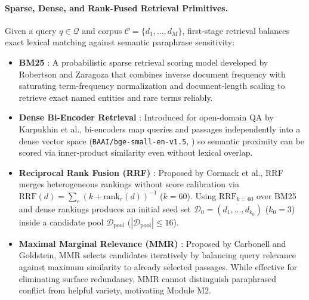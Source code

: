 \documentclass[11pt]{article}
\begin{document}
\paragraph{Sparse, Dense, and Rank-Fused Retrieval Primitives.}
Given a query $q \in \mathcal{Q}$ and corpus $\mathcal{C} = \{d_1, \dots, d_M\}$, first-stage retrieval balances exact lexical matching against semantic paraphrase sensitivity:
\begin{itemize}[leftmargin=*,nosep]
    \item \textbf{BM25} \cite{robertson2009bm25}: A probabilistic sparse retrieval scoring model developed by Robertson and Zaragoza that combines inverse document frequency with saturating term-frequency normalization and document-length scaling to retrieve exact named entities and rare terms reliably.
    \item \textbf{Dense Bi-Encoder Retrieval} \cite{karpukhin2020dpr}: Introduced for open-domain QA by Karpukhin et al., bi-encoders map queries and passages independently into a dense vector space (\texttt{BAAI/bge-small-en-v1.5}, \citealp{chen2024bgem3}) so semantic proximity can be scored via inner-product similarity even without lexical overlap.
    \item \textbf{Reciprocal Rank Fusion (RRF)} \cite{cormack2009rrf}: Proposed by Cormack et al., RRF merges heterogeneous rankings without score calibration via $\text{RRF}(d) = \sum_{r} (k + \text{rank}_r(d))^{-1}$ ($k=60$). Using $\text{RRF}_{k=60}$ over BM25 and dense rankings produces an initial seed set $\mathcal{D}_0 = (d_1, \dots, d_{k_0})$ ($k_0 = 3$) inside a candidate pool $\mathcal{D}_{\text{pool}}$ ($|\mathcal{D}_{\text{pool}}| \le 16$).
    \item \textbf{Maximal Marginal Relevance (MMR)} \cite{carbonell1998mmr}: Proposed by Carbonell and Goldstein, MMR selects candidates iteratively by balancing query relevance against maximum similarity to already selected passages. While effective for eliminating surface redundancy, MMR cannot distinguish paraphrased conflict from helpful variety, motivating Module M2.
\end{itemize}
\end{document}
